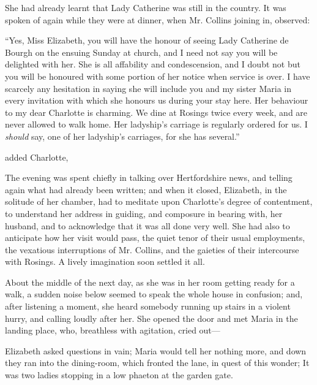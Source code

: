 She had already learnt that Lady Catherine was still in the country. It was spoken of again while they were at dinner, when Mr. Collins joining in, observed:

“Yes, Miss Elizabeth, you will have the honour of seeing Lady Catherine de Bourgh on the ensuing Sunday at church, and I need not say you will be delighted with her. She is all affability and condescension, and I doubt not but you will be honoured with some portion of her notice when service is over. I have scarcely any hesitation in saying she will include you and my sister Maria in every invitation with which she honours us during your stay here. Her behaviour to my dear Charlotte is charming. We dine at Rosings twice every week, and are never allowed to walk home. Her ladyship's carriage is regularly ordered for us. I {\em should} say, one of her ladyship's carriages, for she has several.”

 added Charlotte, 


The evening was spent chiefly in talking over Hertfordshire news, and telling again what had already been written; and when it closed, Elizabeth, in the solitude of her chamber, had to meditate upon Charlotte's degree of contentment, to understand her address in guiding, and composure in bearing with, her husband, and to acknowledge that it was all done very well. She had also to anticipate how her visit would pass, the quiet tenor of their usual employments, the vexatious interruptions of Mr. Collins, and the gaieties of their intercourse with Rosings. A lively imagination soon settled it all.

About the middle of the next day, as she was in her room getting ready for a walk, a sudden noise below seemed to speak the whole house in confusion; and, after listening a moment, she heard somebody running up stairs in a violent hurry, and calling loudly after her. She opened the door and met Maria in the landing place, who, breathless with agitation, cried out---


Elizabeth asked questions in vain; Maria would tell her nothing more, and down they ran into the dining-room, which fronted the lane, in quest of this wonder; It was two ladies stopping in a low phaeton at the garden gate.

